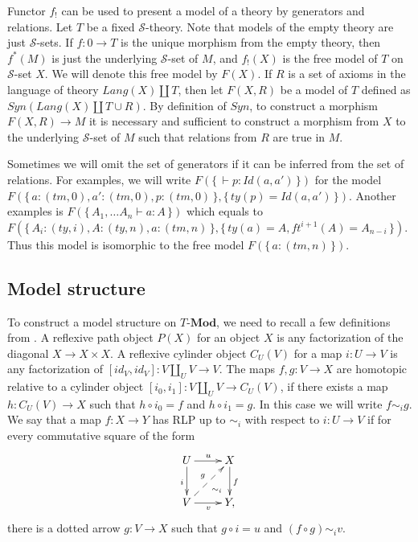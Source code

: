 \documentclass[reqno]{amsart}
\theoremstyle{definition}
\theoremstyle{remark}
\newcommand{\cat}[1]{\mathbf{#1}}
\newcommand{\Mod}[1]{#1\text{-}\cat{Mod}}
\newcommand{\cyli}{i}
\numberwithin{figure}{section}
\begin{document}
Functor $f_!$ can be used to present a model of a theory by generators and relations.
Let $T$ be a fixed $\mathcal{S}$-theory.
Note that models of the empty theory are just $\mathcal{S}$-sets.
If $f : 0 \to T$ is the unique morphism from the empty theory, then $f^*(M)$ is just the underlying $\mathcal{S}$-set of $M$,
    and $f_!(X)$ is the free model of $T$ on $\mathcal{S}$-set $X$.
We will denote this free model by $F(X)$.
If $R$ is a set of axioms in the language of theory $Lang(X) \amalg T$,
    then let $F(X,R)$ be a model of $T$ defined as $Syn(Lang(X) \amalg T \cup R)$.
By definition of $Syn$, to construct a morphism $F(X,R) \to M$ it is necessary and sufficient
    to construct a morphism from $X$ to the underlying $\mathcal{S}$-set of $M$ such that relations from $R$ are true in $M$.

Sometimes we will omit the set of generators if it can be inferred from the set of relations.
For examples, we will write $F(\{\,\vdash p : Id(a,a')\,\})$ for the model $F(\{\,a : (tm,0), a' : (tm,0), p : (tm,0)\,\}, \{\,ty(p) = Id(a,a')\,\})$.
Another examples is $F(\{\,A_1, \ldots A_n \vdash a : A\,\})$ which equals to $F(\{\,A_i : (ty,i), A : (ty,n), a : (tm,n)\,\}, \{\,ty(a) = A, ft^{i+1}(A) = A_{n-i}\,\})$.
Thus this model is isomorphic to the free model $F(\{\,a : (tm,n)\,\})$.

\subsection{Model structure}

To construct a model structure on $\Mod{T}$, we need to recall a few definitions from \cite{f-model-structures}.
A reflexive path object $P(X)$ for an object $X$ is any factorization of the diagonal $X \to X \times X$.
A reflexive cylinder object $C_U(V)$ for a map $i : U \to V$ is any factorization of $[id_V,id_V] : V \amalg_U V \to V$.
The maps $f,g : V \to X$ are homotopic relative to a cylinder object $[\cyli_0,\cyli_1] : V \amalg_U V \to C_U(V)$, if there exists a map $h : C_U(V) \to X$
such that $h \circ \cyli_0 = f$ and $h \circ \cyli_1 = g$.
In this case we will write $f \sim_i g$.
We say that a map $f : X \to Y$ has RLP up to $\sim_i$ with respect to $i : U \to V$ if for every commutative square of the form
\[ \xymatrix{ U \ar[r]^u \ar@{}[dr]|(.7){\sim_i} \ar[d]_i & X \ar[d]^f \\
              V \ar[r]_v \ar@{-->}[ur]^g                  & Y,
            } \]
there is a dotted arrow $g : V \to X$ such that $g \circ i = u$ and $(f \circ g) \sim_i v$.
\end{document}
